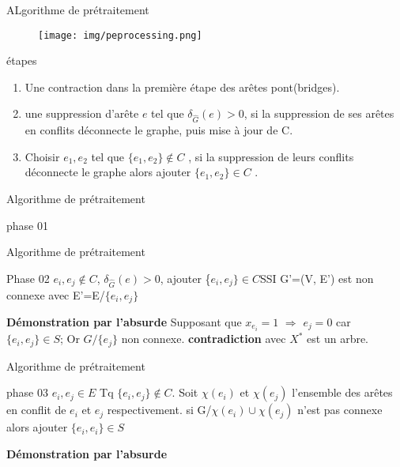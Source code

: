 \begin{frame}{ALgorithme de prétraitement}
\begin{figure}
    \centering
    \texttt{[image: img/peprocessing.png]}
\end{figure}
    

\begin{block}{étapes}
\begin{enumerate}
    \item  Une contraction dans la première étape des arêtes pont(bridges).
    \item une suppression d'arête $e$ tel que $\delta_{ \hat{G}}(e) > 0 $, si la suppression de ses arêtes en conflits déconnecte le graphe, puis mise à jour de C.
    \item Choisir $e_{1},e_{2}$ tel que $\{e_{1},e_{2}\} \not\in C$ , si la suppression de leurs conflits déconnecte le graphe alors ajouter $\{e_{1},e_{2}\} \in C$ .
\end{enumerate}
   

\end{block}

\end{frame}
\begin{frame}{Algorithme de prétraitement}
\begin{block}{phase 01}

\end{block}

    
\end{frame}

\begin{frame}{Algorithme de prétraitement}
\begin{block}{Phase 02}
 \forall $ e_{i},e_{j}   \not\in C $, $\delta_{ \hat{G}}(e) > 0 $, ajouter \{$e_{i},e_{j}\} \in C$\quad SSI \quad G'=(V, E') est non connexe avec E'=E/$\{e_{i},e_{j}\}$
\end{block}

\textbf{Démonstration par l'absurde}
\newline
Supposant que $x_{e_{i}}=1$ \quad \textbf{$\Rightarrow $} \quad   $e_{j}=0$ car $\{e_{i},e_{j}\} \in S $; 
\newline Or $G/\{e_{j}\}$ non connexe.
\newline \textbf{contradiction} avec $X^*$ est un arbre.
\end{frame}
\begin{frame}{Algorithme de prétraitement}
\begin{block}{phase 03}
\forall $ e_{i},e_{j} \in E $\; Tq $\{e_{i},e_{j}\} \not\in C. $\newline
Soit $\chi(e_{i})$ et  $\chi(e_{j})$ l'ensemble des arêtes en conflit de $e_{i}$ et $e_{j}$ respectivement.
si G/$\chi(e_{i}) \cup \chi(e_{j})$ n'est pas connexe alors ajouter $\{e_{i},e_{i}\} \in S $
\end{block}
\textbf{Démonstration  par l'absurde}

    
\end{frame}